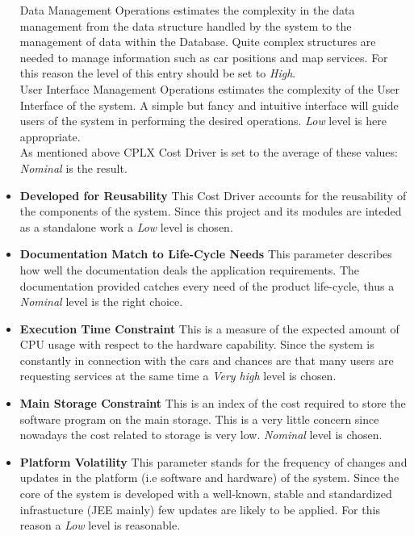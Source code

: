 \documentclass[11pt,a4paper]{report}
\begin{document}
\begin{itemize}
Data Management Operations estimates the complexity in the data management from the data structure handled by the system to the management of data within the Database. Quite complex structures are needed to manage information such as car positions and map services. For this reason the level of this entry should be set to \textit{High}.\\
User Interface Management Operations estimates the complexity of the User Interface of the system. A simple but fancy and intuitive interface will guide users of the system in performing the desired operations. \textit{Low} level is here appropriate.\\
As mentioned above CPLX Cost Driver is set to the average of these values: \textit{Nominal} is the result.
\newpage
	\item \textbf{Developed for Reusability}
This Cost Driver accounts for the reusability of the components of the system. Since this project and its modules are inteded as a standalone work a \textit{Low} level is chosen.
	\item \textbf{Documentation Match to Life-Cycle Needs}
This parameter describes how well the documentation deals the application requirements. The documentation provided catches every need of the product life-cycle, thus a \textit{Nominal} level is the right choice.
	\item \textbf{Execution Time Constraint}
This is a measure of the expected amount of CPU usage with respect to the hardware capability. Since the system is constantly in connection with the cars and chances are that many users are requesting services at the same time a \textit{Very high} level is chosen.
\newpage
	\item \textbf{Main Storage Constraint}
This is an index of the cost required to store the software program on the main storage. This is a very little concern since nowadays the cost related to storage is very low. \textit{Nominal} level is chosen. 
	\item \textbf{Platform Volatility}
This parameter stands for the frequency of changes and updates in the platform (i.e software and hardware) of the system. Since the core of the system is developed with a well-known, stable and standardized infrastucture (JEE mainly) few updates are likely to be applied. For this reason a \textit{Low} level is reasonable.

\end{itemize}
\end{document}
